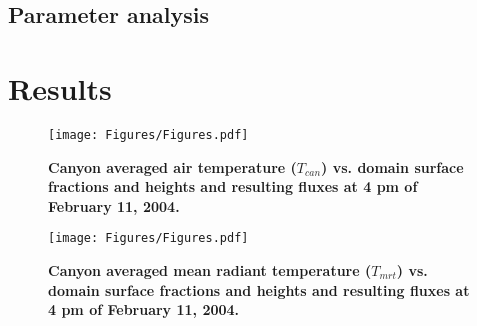 \documentclass[final,3p,times,authoryear]{elsarticle}
\begin{document}
\subsection{Parameter analysis}\label{sec:methodsparam}




\section{Results}\label{sec:results}




\begin{figure*}
\centering
\texttt{[image: Figures/Figures.pdf]}
\caption{\bf Canyon averaged air temperature ($T_{can}$) vs. domain surface fractions and heights and resulting fluxes at 4 pm of February 11, 2004.}
 \label{fig:tcanfluxes}
\end{figure*} 

\begin{figure*}
\centering
\texttt{[image: Figures/Figures.pdf]}
\caption{\bf Canyon averaged mean radiant temperature ($T_{mrt}$) vs. domain surface fractions and heights and resulting fluxes at 4 pm of February 11, 2004.}
 \label{fig:tmrtfluxes}
\end{figure*} 
\end{document}
